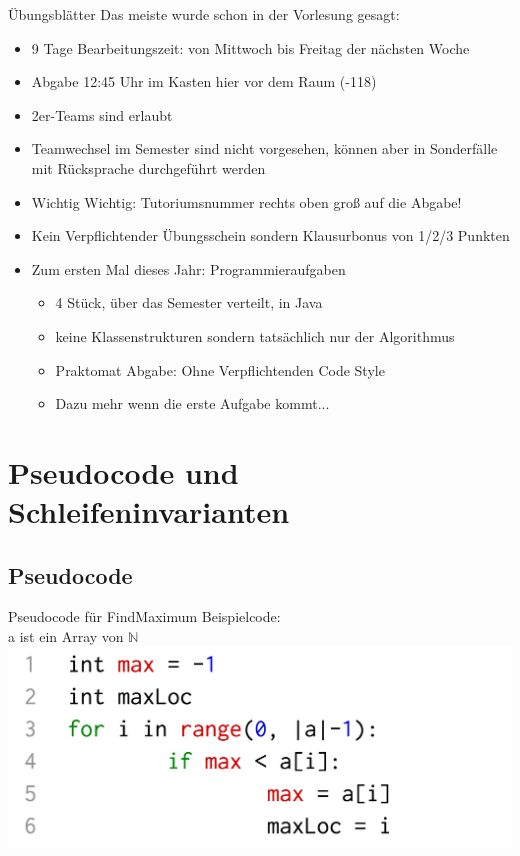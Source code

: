 \documentclass[18pt]{beamer}
\begin{document}
	\begin{frame}{Übungsblätter}
		Das meiste wurde schon in der Vorlesung gesagt:
		\begin{itemize}
			\item 9 Tage Bearbeitungszeit: von Mittwoch bis Freitag der nächsten Woche
			\item Abgabe 12:45 Uhr im Kasten hier vor dem Raum (-118)
			\item 2er-Teams sind erlaubt
			\item Teamwechsel im Semester sind nicht vorgesehen, können aber in Sonderfälle mit Rücksprache durchgeführt werden
			\item Wichtig Wichtig: Tutoriumsnummer rechts oben groß auf die Abgabe!
			\item Kein Verpflichtender Übungsschein sondern Klausurbonus von 1/2/3 Punkten
			\item Zum ersten Mal dieses Jahr: Programmieraufgaben
			\begin{itemize}
				\item 4 Stück, über das Semester verteilt, in Java
				\item keine Klassenstrukturen sondern tatsächlich nur der Algorithmus
				\item Praktomat Abgabe: Ohne Verpflichtenden Code Style
				\item Dazu mehr wenn die erste Aufgabe kommt...
			\end{itemize}
		\end{itemize}		
	\end{frame}

\section{Pseudocode und Schleifeninvarianten}
	\subsection{Pseudocode}
	\begin{frame} {Pseudocode für FindMaximum} 
		Beispielcode:\\
		a ist ein Array von $\mathbb{N}$
		\includegraphics[align=center, scale=0.25]{pics/pseudocode01.png}		
	\end{frame} 
\end{document}
